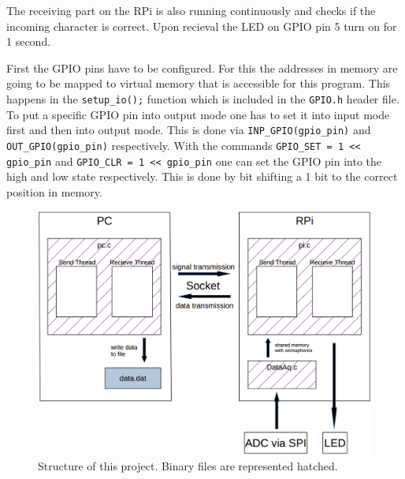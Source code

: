 \documentclass[12pt,paper=a4,twoside]{scrartcl}
\numberwithin{equation}{section}
\begin{document}
The receiving part on the RPi is also running continuously and checks if the incoming character is correct. Upon recieval the LED on GPIO pin 5 turn on for 1 second.

First the GPIO pins have to be configured. For this the addresses in memory are going to be mapped to virtual memory that is accessible for this program. This happens in the \verb+setup_io();+ function which is included in the \verb+GPIO.h+ header file. To put a specific GPIO pin into output mode one has to set it into input mode first and then into output mode. This is done via \verb+INP_GPIO(gpio_pin)+ and \verb+OUT_GPIO(gpio_pin)+ respectively. With the commands \verb+GPIO_SET = 1 << gpio_pin+ and \verb+GPIO_CLR = 1 << gpio_pin+ one can set the GPIO pin into the high and low state respectively. This is done by bit shifting a 1 bit to the correct position in memory.


\begin{figure}
\centering
\includegraphics[scale=0.4]{schematic.png}
\caption{Structure of this project. Binary files are represented hatched.}
\label{schematic}
\end{figure}

%
\end{document}
